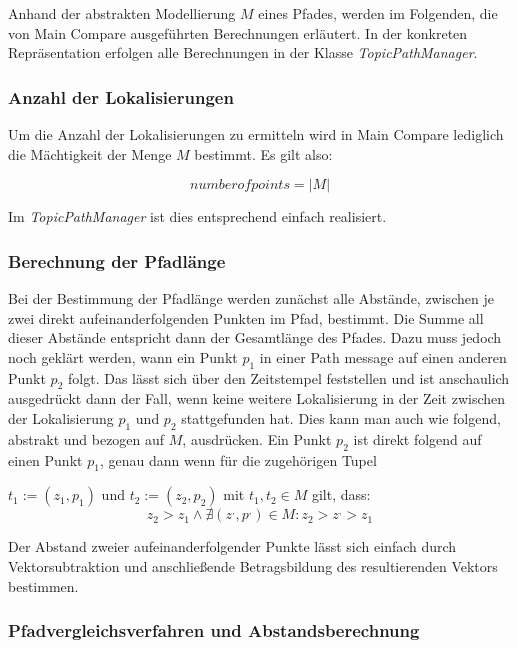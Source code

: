 Anhand der abstrakten Modellierung $M$ eines Pfades, werden im Folgenden, die von
Main Compare ausgeführten Berechnungen erläutert. In der konkreten
Repräsentation erfolgen alle Berechnungen in der Klasse \textit{TopicPathManager}. 

\subsubsection{Anzahl der Lokalisierungen}
Um die Anzahl der Lokalisierungen zu ermitteln wird in Main Compare lediglich die
Mächtigkeit der Menge $M$ bestimmt. Es gilt also:

\begin{equation*}
  \label{eqn:numofpoints}
  number of points = \vert M \vert
\end{equation*}

Im \textit{TopicPathManager} ist dies entsprechend einfach realisiert.

\subsubsection{Berechnung der Pfadlänge}
Bei der Bestimmung der Pfadlänge werden zunächst alle Abstände, zwischen je
zwei direkt aufeinanderfolgenden Punkten im Pfad, bestimmt. Die Summe all dieser
Abstände entspricht dann der Gesamtlänge des Pfades. Dazu muss jedoch noch
geklärt werden, wann ein Punkt $p_1$ in einer Path message auf einen anderen
Punkt $p_2$ folgt. Das lässt sich über den Zeitstempel feststellen und ist
anschaulich ausgedrückt dann der Fall, wenn keine weitere Lokalisierung in
der Zeit zwischen der Lokalisierung $p_1$ und $p_2$ stattgefunden hat. Dies kann man auch wie
folgend, abstrakt und bezogen auf $M$, ausdrücken.  Ein Punkt $p_2$ ist direkt
folgend auf einen Punkt $p_1$, genau dann wenn für die zugehörigen Tupel

$t_1 := (z_1, p_1)$ und $t_2 := (z_2, p_2)$
mit
$t_1,t_2 \in M$
gilt, dass:
\[
z_2 > z_1 \wedge \nexists (z^{,}, p^{,}) \in M : z_2 > z^{,} > z_1
\]

Der Abstand zweier aufeinanderfolgender Punkte lässt sich einfach durch
Vektorsubtraktion und anschließende Betragsbildung des resultierenden Vektors
bestimmen.

\subsubsection{Pfadvergleichsverfahren und Abstandsberechnung}

